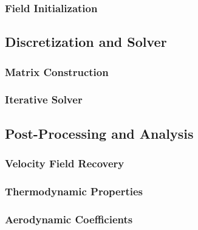 \subsubsection{Field Initialization}


\subsection{Discretization and Solver}

\subsubsection{Matrix Construction}


\subsubsection{Iterative Solver}


\subsection{Post-Processing and Analysis}

\subsubsection{Velocity Field Recovery}


\subsubsection{Thermodynamic Properties}


\subsubsection{Aerodynamic Coefficients}



